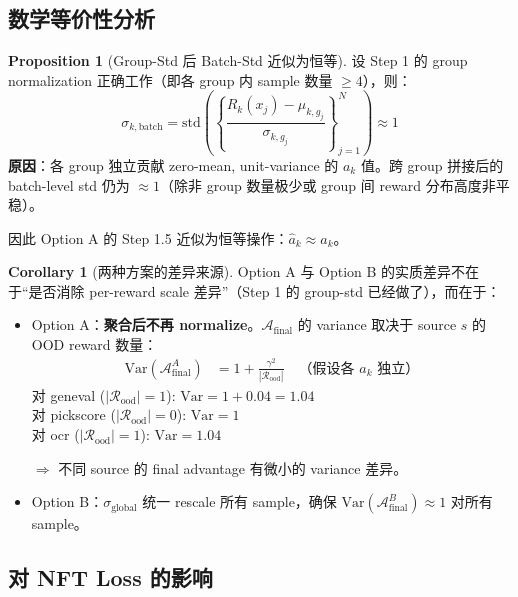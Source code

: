 \documentclass[11pt,a4paper]{article}
\theoremstyle{definition}
\newtheorem{proposition}{Proposition}
\newtheorem{corollary}{Corollary}
\begin{document}
\subsection{数学等价性分析}

\begin{proposition}[Group-Std 后 Batch-Std 近似为恒等]
\label{prop:batch_std_identity}
设 Step 1 的 group normalization 正确工作（即各 group 内 sample 数量 $\geq 4$），则：
\begin{equation}
\sigma_{k,\mathrm{batch}} = \mathrm{std}\left(\left\{\frac{R_k(x_j) - \mu_{k,g_j}}{\sigma_{k,g_j}}\right\}_{j=1}^N\right) \approx 1
\end{equation}
\textbf{原因}：各 group 独立贡献 zero-mean, unit-variance 的 $a_k$ 值。跨 group 拼接后的 batch-level std 仍为 $\approx 1$（除非 group 数量极少或 group 间 reward 分布高度非平稳）。

因此 Option A 的 Step 1.5 近似为恒等操作：$\hat{a}_k \approx a_k$。
\end{proposition}

\begin{corollary}[两种方案的差异来源]
\label{cor:diff_source}
Option A 与 Option B 的实质差异不在于``是否消除 per-reward scale 差异''（Step 1 的 group-std 已经做了），而在于：
\begin{itemize}[leftmargin=1.5em]
\item Option A：\textbf{聚合后不再 normalize}。$\mathcal{A}_{\mathrm{final}}$ 的 variance 取决于 source $s$ 的 OOD reward 数量：
\begin{align}
\mathrm{Var}(\mathcal{A}^A_{\mathrm{final}}) &= 1 + \frac{\gamma^2}{|\mathcal{R}_{\mathrm{ood}}|} \quad\text{（假设各 $a_k$ 独立）}
\end{align}
对 geneval ($|\mathcal{R}_{\mathrm{ood}}| = 1$): $\mathrm{Var} = 1 + 0.04 = 1.04$\\
对 pickscore ($|\mathcal{R}_{\mathrm{ood}}| = 0$): $\mathrm{Var} = 1$\\
对 ocr ($|\mathcal{R}_{\mathrm{ood}}| = 1$): $\mathrm{Var} = 1.04$

$\Rightarrow$ 不同 source 的 final advantage 有微小的 variance 差异。

\item Option B：$\sigma_{\mathrm{global}}$ 统一 rescale 所有 sample，确保 $\mathrm{Var}(\mathcal{A}^B_{\mathrm{final}}) \approx 1$ 对所有 sample。
\end{itemize}
\end{corollary}

\subsection{对 NFT Loss 的影响}
\end{document}
